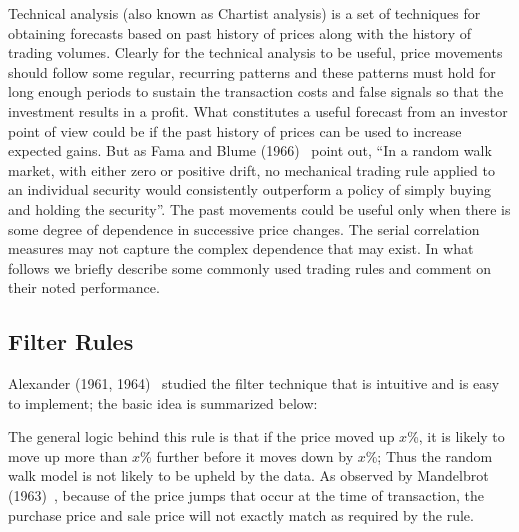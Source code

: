 Technical analysis (also known as Chartist analysis) is a set of techniques for obtaining forecasts based on past history of prices along with the history of trading volumes. Clearly for the technical analysis to be useful, price movements should follow some regular, recurring patterns and these patterns must hold for long enough periods to sustain the transaction costs and false signals so that the investment results in a profit. What constitutes a useful forecast from an investor point of view could be if the past history of prices can be used to increase expected gains. But as Fama and Blume (1966)~\cite{famablume} point out, ``In a random walk market, with either zero or positive drift, no mechanical trading rule applied to an individual security would consistently outperform a policy of simply buying and holding the security''. The past movements could be useful only when there is some degree of dependence in successive price changes. The serial correlation measures may not capture the complex dependence that may exist. In what follows we briefly describe some commonly used trading rules and comment on their noted performance.



\subsection{Filter Rules}


Alexander (1961, 1964)~\cite{alexander61,alexander64} studied the filter technique that is intuitive and is easy to implement; the basic idea is summarized below: \twomedskip


 \twomedskip


The general logic behind this rule is that if the price moved up $x$\%, it is likely to move up more than $x$\% further before it moves down by $x$\%; Thus the random walk model is not likely to be upheld by the data. As observed by Mandelbrot (1963)~\cite{mandelbrot}, because of the price jumps that occur at the time of transaction, the purchase price and sale price will not exactly match as required by the rule.


